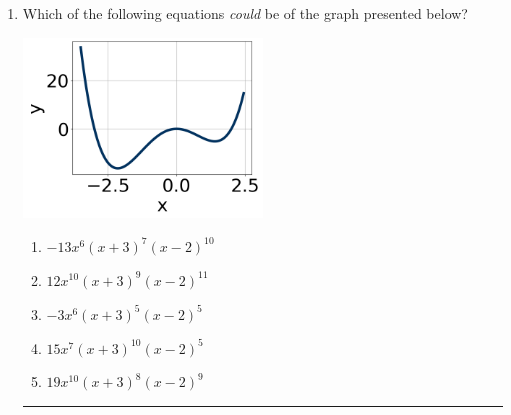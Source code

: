 \documentclass[14pt]{extbook}
\newcommand{\litem}[1]{\item#1\hspace*{-1cm}\rule{\textwidth}{0.4pt}}
\begin{document}
\begin{enumerate}
{\begin{enumerate}[label=\Alph*.]
\end{enumerate} }
\litem{
Which of the following equations \textit{could} be of the graph presented below?
\begin{center}
    \includegraphics[width=0.5\textwidth]{../Figures/polyGraphToFunctionC.png}
\end{center}
\begin{enumerate}[label=\Alph*.]
\item \( -13x^{6} (x + 3)^{7} (x - 2)^{10} \)
\item \( 12x^{10} (x + 3)^{9} (x - 2)^{11} \)
\item \( -3x^{6} (x + 3)^{5} (x - 2)^{5} \)
\item \( 15x^{7} (x + 3)^{10} (x - 2)^{5} \)
\item \( 19x^{10} (x + 3)^{8} (x - 2)^{9} \)


\end{enumerate}}
\end{enumerate}
\end{document}
